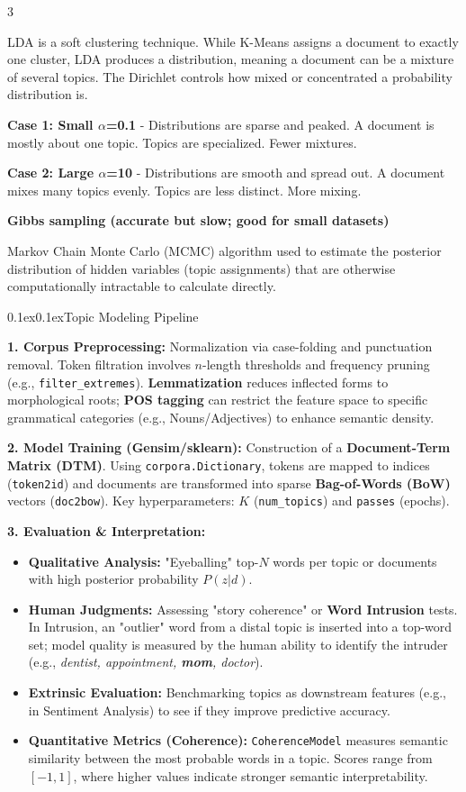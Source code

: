 \documentclass[8pt,landscape]{article}
\makeatletter
\renewcommand{\subsection}{\@startsection{subsection}{2}{0pt}%
    {0.1ex}{0.1ex}{\fontsize{7}{8}\bfseries\color{blue}}}
\newcommand{\code}[1]{\textcolor{myred}{\texttt{#1}}}
\newcommand{\smalltext}[1]{{\fontsize{7}{8}\selectfont\sloppy #1\par}}
\makeatother
\begin{document}
\begin{multicols}{3}
{LDA is a soft clustering technique. While K-Means assigns a document to exactly one cluster, LDA produces a distribution, meaning a document can be a mixture of several topics.
The Dirichlet controls how mixed or concentrated a probability distribution is.

\textbf{Case 1: Small $\alpha$=0.1} - Distributions are sparse and peaked.
A document is mostly about one topic.
Topics are specialized.
Fewer mixtures.

\textbf{Case 2: Large $\alpha$=10} - Distributions are smooth and spread out.
A document mixes many topics evenly.
Topics are less distinct.
More mixing.
}

\textbf{Gibbs sampling (accurate but slow; good for small datasets)}
\smalltext{
    Markov Chain Monte Carlo (MCMC) algorithm used to estimate the posterior distribution of hidden variables (topic assignments) that are otherwise computationally intractable to calculate directly.
}
\subsection{Topic Modeling Pipeline}
\smalltext{
   \textbf{1. Corpus Preprocessing:} Normalization via case-folding and punctuation removal. Token filtration involves $n$-length thresholds and frequency pruning (e.g., \code{filter\_extremes}). \textbf{Lemmatization} reduces inflected forms to morphological roots; \textbf{POS tagging} can restrict the feature space to specific grammatical categories (e.g., Nouns/Adjectives) to enhance semantic density.
   
   \textbf{2. Model Training (Gensim/sklearn):} Construction of a \textbf{Document-Term Matrix (DTM)}. Using \code{corpora.Dictionary}, tokens are mapped to indices (\code{token2id}) and documents are transformed into sparse \textbf{Bag-of-Words (BoW)} vectors (\code{doc2bow}). Key hyperparameters: $K$ (\code{num\_topics}) and \code{passes} (epochs).
   
   \textbf{3. Evaluation \& Interpretation:}
   \begin{itemize}
       \item \textbf{Qualitative Analysis:} "Eyeballing" top-$N$ words per topic or documents with high posterior probability $P(z|d)$.
       \item \textbf{Human Judgments:} Assessing "story coherence" or \textbf{Word Intrusion} tests. In Intrusion, an "outlier" word from a distal topic is inserted into a top-word set; model quality is measured by the human ability to identify the intruder (e.g., \textit{dentist, appointment, \textbf{mom}, doctor}).
       \item \textbf{Extrinsic Evaluation:} Benchmarking topics as downstream features (e.g., in Sentiment Analysis) to see if they improve predictive accuracy.
       \item \textbf{Quantitative Metrics (Coherence):} \code{CoherenceModel} measures semantic similarity between the most probable words in a topic. Scores range from $[-1, 1]$, where higher values indicate stronger semantic interpretability.
   \end{itemize}
}


\end{multicols}
\end{document}
